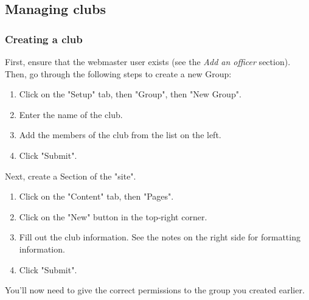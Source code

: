 \documentclass[11pt]{report}
\begin{document}
		\subsection{Managing clubs}
			\subsubsection{Creating a club}
				First, ensure that the webmaster user exists (see the \textit{Add an officer} section). Then, go through the following steps to create a new Group:
				
				\begin{enumerate}
					\item{Click on the "Setup" tab, then "Group", then "New Group".}
					\item{Enter the name of the club.}
					\item{Add the members of the club from the list on the left.}
					\item{Click "Submit".}
				\end{enumerate}
				
				Next, create a Section of the "site".
				
				\begin{enumerate}
					\item{Click on the "Content" tab, then "Pages".}
					\item{Click on the "New" button in the top‐right corner.}
					\item{Fill out the club information. See the notes on the right side for formatting information.}
					\item{Click "Submit".}
				\end{enumerate}
				
				You'll now need to give the correct permissions to the group you created earlier.
				
\end{document}
